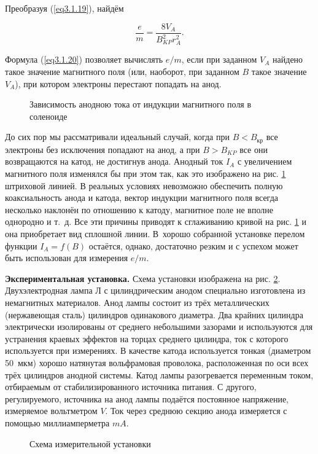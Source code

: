 Преобразуя (\ref{eq3.1.19}), найдём

\begin{equation}
\frac{e}{m}=\frac{8V_A}{B_{KP}^2r_A^2}.
\label{eq3.1.20}
\end{equation}

Формула (\ref{eq3.1.20}) позволяет вычислять $e/m$, если при заданном $V_A$ найдено такое значение магнитного поля (или, наоборот, при заданном $B$ такое значение $V_A$), при котором электроны перестают попадать на анод.

\begin{figure}
\caption{Зависимость анодною тока от индукции магнитного поля в соленоиде}
\label{fig3.1.4}
\end{figure}

До сих пор мы рассматривали идеальный случай, когда при $B<B_{кр}$ все электроны без исключения попадают на анод, а при $B>B_{KP}$ все они возвращаются на катод, не достигнув анода. Анодный ток $I_A$ с увеличением магнитного поля изменялся бы при этом так, как это изображено на рис. \ref{fig3.1.4} штриховой линией. В реальных условиях невозможно обеспечить полную коаксиальность анода и катода, вектор индукции магнитного поля всегда несколько наклонён по отношению к катоду, магнитное поле не вполне однородно и т.~д. Все эти причины приводят к сглаживанию кривой на рис. \ref{fig3.1.4} и она приобретает вид сплошной линии. В~хорошо собранной установке перелом функции $I_A=f(B)$ остаётся, однако, достаточно резким и с успехом может быть использован для измерения $e/m$.

{\bf Экспериментальная установка.} Схема установки изображена на рис. \ref{fig3.1.5}. Двухэлектродная лампа Л с цилиндрическим анодом специально изготовлена из немагнитных материалов. Анод лампы состоит из трёх металлических (нержавеющая сталь) цилиндров одинакового диаметра. Два крайних цилиндра электрически изолированы от среднего небольшими зазорами и используются для устранения краевых эффектов на торцах среднего цилиндра, ток с которого используется при измерениях. В качестве катода используется тонкая (диаметром 50~мкм) хорошо натянутая вольфрамовая проволока, расположенная по оси всех трёх цилиндров анодной системы.
Катод лампы разогревается переменным током, отбираемым от стабилизированного источника питания. С другого,  регулируемого,  источника на анод лампы подаётся постоянное напряжение, измеряемое вольтметром $V$. Ток через среднюю секцию анода измеряется с помощью миллиамперметра $mA$.

\begin{figure}
\caption{Схема измерительной установки}
\label{fig3.1.5}
\end{figure}

